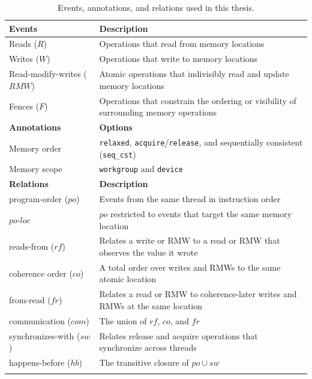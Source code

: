 \begin{table}
   \footnotesize
   \centering
   \caption{Events, annotations, and relations used in this thesis.}
   \label{tab:bg-mcs}
   \begingroup
   \begin{tabularx}{\columnwidth}{L{2.7cm} Y}
   \toprule
   \textbf{Events} & \textbf{Description} \\
   \midrule
   Reads ($R$) & Operations that read from memory locations \\
    Writes ($W$) & Operations that write to memory locations \\
   Read-modify-writes ($RMW$) & Atomic operations that indivisibly read and update memory locations \\
    Fences ($F$) & Operations that constrain the ordering or visibility of surrounding memory operations \\
   \toprule
   \textbf{Annotations} & \textbf{Options} \\
   \midrule
   Memory order & \texttt{relaxed}, \texttt{acquire}/\texttt{release}, and sequentially consistent (\texttt{seq\_cst}) \\
    Memory scope & \texttt{workgroup} and \texttt{device} \\
   \toprule
   \textbf{Relations} & \textbf{Description} \\
   \midrule
   program-order ($po$) & Events from the same thread in instruction order \\
    $\textit{po-loc}$ & $po$ restricted to events that target the same memory location \\
   reads-from ($rf$) & Relates a write or RMW to a read or RMW that observes the value it wrote \\
    coherence order ($co$) & A total order over writes and RMWs to the same atomic location \\
   from-read ($fr$) & Relates a read or RMW to coherence-later writes and RMWs at the same location \\
    communication ($com$) & The union of $rf$, $co$, and $fr$ \\
   synchronizes-with ($sw$) & Relates release and acquire operations that synchronize across threads \\
    happens-before ($hb$) & The transitive closure of $po \cup sw$ \\
   \graybottomrule
   \end{tabularx}
   \endgroup
\end{table}


